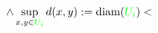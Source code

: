 \documentclass[preview]{standalone}
\begin{document}
\begin{align*}
\land \sup_{x,y \in \textcolor{green}{U_i}} d(x,y) := \text{diam}(\textcolor{green}{U_i}) <
\end{align*}
\end{document}
